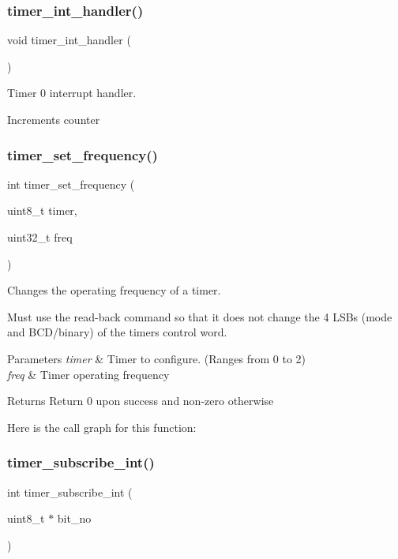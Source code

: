 \subsubsection{\texorpdfstring{timer\_int\_handler()}{timer\_int\_handler()}}
{\footnotesize\ttfamily void timer\+\_\+int\+\_\+handler (\begin{DoxyParamCaption}{ }\end{DoxyParamCaption})}



Timer 0 interrupt handler. 

Increments counter \mbox{\label{group__timer_gaca1506be74dfc71c6f90772ca269c619}} 
\subsubsection{\texorpdfstring{timer\_set\_frequency()}{timer\_set\_frequency()}}
{\footnotesize\ttfamily int timer\+\_\+set\+\_\+frequency (\begin{DoxyParamCaption}\item[{uint8\+\_\+t}]{timer,  }\item[{uint32\+\_\+t}]{freq }\end{DoxyParamCaption})}



Changes the operating frequency of a timer. 

Must use the read-\/back command so that it does not change the 4 L\+S\+Bs (mode and B\+C\+D/binary) of the timer\textquotesingle{}s control word.


\begin{DoxyParams}{Parameters}
{\em timer} & Timer to configure. (Ranges from 0 to 2) \\
\hline
{\em freq} & Timer operating frequency \\
\hline
\end{DoxyParams}
\begin{DoxyReturn}{Returns}
Return 0 upon success and non-\/zero otherwise 
\end{DoxyReturn}
Here is the call graph for this function\+:
\mbox{\label{group__timer_ga6f786481e80308348d629d605ffa2d84}} 
\subsubsection{\texorpdfstring{timer\_subscribe\_int()}{timer\_subscribe\_int()}}
{\footnotesize\ttfamily int timer\+\_\+subscribe\+\_\+int (\begin{DoxyParamCaption}\item[{uint8\+\_\+t $\ast$}]{bit\+\_\+no }\end{DoxyParamCaption})}



